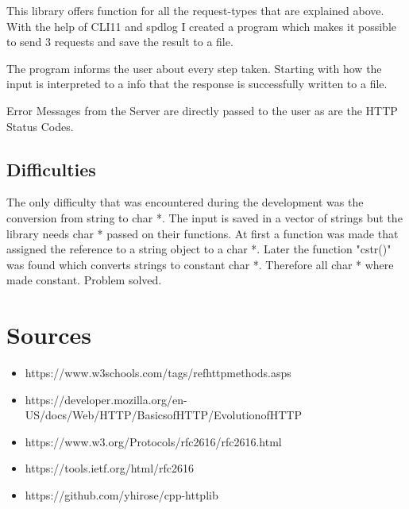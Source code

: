 \documentclass{article}
\begin{document}
\vspace{\baselineskip}

This library offers function for all the request-types that are explained above. With the help of CLI11 and spdlog I created a program which makes it possible to send 3 requests and save the result to a file.

\vspace{\baselineskip}

The program informs the user about every step taken. Starting with how the input is interpreted to a info that the response is successfully written to a file.

\vspace{\baselineskip}

Error Messages from the Server are directly passed to the user as are the HTTP Status Codes. 

\subsection{Difficulties}
The only difficulty that was encountered during the development was the conversion from string to char *. The input is saved in a vector of strings but the library needs char * passed on their functions. 
At first a function was made that assigned the reference to a string object to a char *. Later the function "c\textunderscore str()" was found which converts strings to constant char *. Therefore all char * where made constant. Problem solved. 


\section{Sources}
\begin{itemize}
  \item https://www.w3schools.com/tags/ref\textunderscore httpmethods.asps
  \item https://developer.mozilla.org/en-US/docs/Web/HTTP/Basics\textunderscore of\textunderscore HTTP/Evolution\textunderscore of\textunderscore HTTP
  \item https://www.w3.org/Protocols/rfc2616/rfc2616.html
  \item https://tools.ietf.org/html/rfc2616
  \item https://github.com/yhirose/cpp-httplib
\end{itemize}
\end{document}
